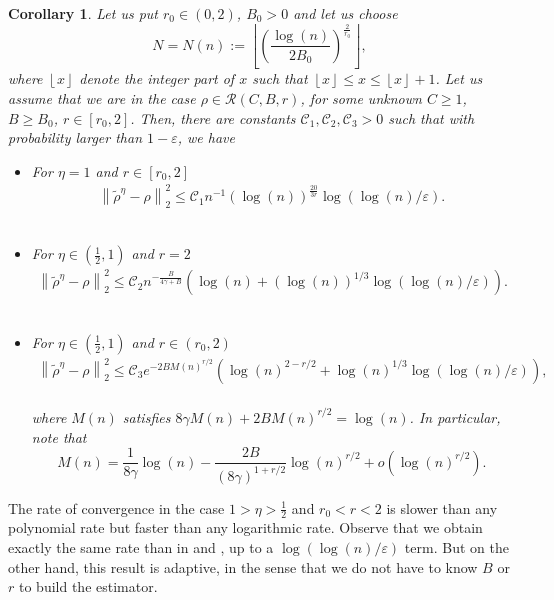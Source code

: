 \documentclass[a4paper]{amsart}
\newtheorem{cor}{Corollary}[section]
\begin{document}
\begin{cor}
           \label{coro1}
           Let us put $r_{0}\in(0,2)$, $B_{0}>0$ and let us choose
                    \begin{equation}
         \label{Ncorr1}
                      N = N(n) := \left\lfloor \left(\frac{\log(n)}{2B_{0}}\right)^{\frac{2}{r_{0}}}
                   \right\rfloor,
           \end{equation}
where $\left\lfloor x \right\rfloor$ denote the integer part of $x$ such that $\left\lfloor x \right\rfloor\leq x\leq  \left\lfloor x \right\rfloor+1$. Let us assume that we are in the case $\rho\in\mathcal{R}(C,B,r)$, for some
unknown $C\geq 1$, $B\geq B_{0}$, $r\in[r_0 , 2]$. Then, there are constants
$\mathcal{C}_{1},\mathcal{C}_ {2},\mathcal{C}_{3}>0$ such that with probability
larger than $1-\varepsilon$, we have\\
\begin{itemize}
\item For  $\eta = 1$ and $r\in[r_0,2]$
            \begin{align*}
                    \left\|\tilde{\rho}^\eta - \rho \right\|^{2}_{2}
\leq\mathcal{C}_1 n^{-1}\left(\log(n)\right)^{\frac{20}{3r}}\log
\left(\log(n)/\varepsilon\right).
              \end{align*}      \\
\item   For $\eta\in(\frac{1}{2},1)$ and $ r=2$             
            \begin{align*}
                    \left\|\tilde{\rho}^\eta - \rho \right\|^{2}_{2}\leq
\mathcal{C}_2   n^{-\frac{B}{4\gamma+B}}\left(\log(n)+\left(\log(n)\right)^{1/3}
\log\left( \log (n)/\varepsilon\right) \right). 
            \end{align*} \\               
\item   For $\eta\in(\frac{1}{2},1)$ and  $r\in(r_0,2)$                
            \begin{align*}
                    \left\|\tilde{\rho}^\eta - \rho \right\|^{2}_{2}\leq 
\mathcal{C}_3   e^{-2BM(n)^{r/2}} \left( \log(n)^{2-r/2}
+\log(n)^{1/3}\log\left( \log (n)/\varepsilon\right)  \right),
                   \end{align*} \\
 where $ M(n) $ satisfies $8 \gamma M(n) + 2 B M(n)^{r/2} = \log(n)$.  In
particular, note that 
 $$ M(n)= \frac{1}{8\gamma} \log(n) - \frac{2B}{(8\gamma)^{1+r/2}} \log(n)^{r/2}
+ o(\log(n)^{r/2}).$$
 \end{itemize}
\end{cor}
The rate of convergence in the case $1>\eta>\frac{1}{2}$ and $r_{0}<r<2$ is
slower than any polynomial rate but faster than any logarithmic rate.
Observe that we obtain exactly the same rate than in \cite{ABM} and
\cite{Katia}, up to a $\log(\log(n)/\varepsilon)$ term. But on the other hand,
this result is adaptive, in the sense that we do not have to know $B$ or $r$ to
build the estimator.
\end{document}

